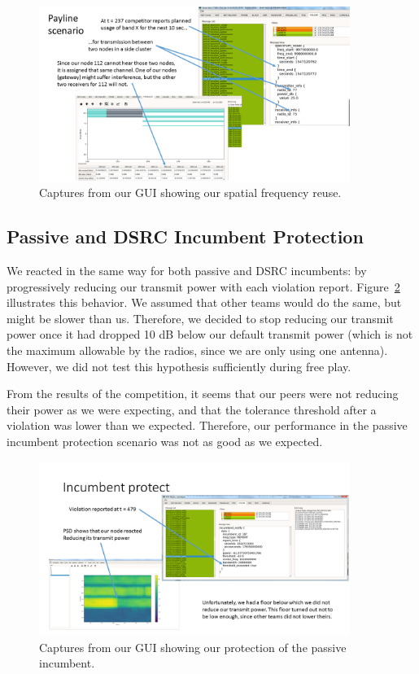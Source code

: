 \documentclass[11pt]{article}
\begin{document}
\begin{figure} [h]
 \centerline{
 \includegraphics[width = 0.9\textwidth]{Figures/FreqReuse.png}}
 \caption{Captures from our GUI showing our spatial frequency reuse.}
 \label{fg:freqreuse}
 \end{figure} 
 
\subsection{Passive and DSRC Incumbent Protection}

We reacted in the same way for both passive and DSRC incumbents: by progressively reducing our transmit power with each violation report. Figure~\ref{fg:passiveInc} illustrates this behavior. We assumed that other teams would do the same, but might be slower than us. Therefore, we decided to stop reducing our transmit power once it had dropped 10 dB below our default transmit power (which is not the maximum allowable by the radios, since we are only using one antenna). However, we did not test this hypothesis sufficiently during free play.

From the results of the competition, it seems that our peers were not reducing their power as we were expecting, and that the tolerance threshold after a violation was lower than we expected. Therefore, our performance in the passive incumbent protection scenario was not as good as we expected.

\begin{figure} [h]
 \centerline{
 \includegraphics[width = 0.9\textwidth]{Figures/PassiveIncumbent.png}}
 \caption{Captures from our GUI showing our protection of the passive incumbent.}
 \label{fg:passiveInc}
 \end{figure} 
\end{document}
